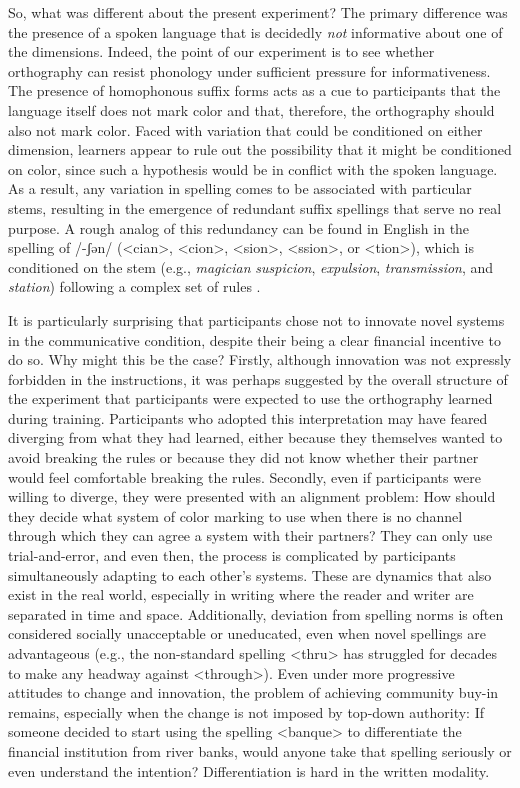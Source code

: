 \documentclass[doc,biblatex]{apa7}
\begin{document}
So, what was different about the present experiment? The primary difference was the presence of a spoken language that is decidedly \textit{not} informative about one of the dimensions. Indeed, the point of our experiment is to see whether orthography can resist phonology under sufficient pressure for informativeness. The presence of homophonous suffix forms acts as a cue to participants that the language itself does not mark color and that, therefore, the orthography should also not mark color. Faced with variation that could be conditioned on either dimension, learners appear to rule out the possibility that it might be conditioned on color, since such a hypothesis would be in conflict with the spoken language. As a result, any variation in spelling comes to be associated with particular stems, resulting in the emergence of redundant suffix spellings that serve no real purpose. A rough analog of this redundancy can be found in English in the spelling of /-ʃən/ (<cian>, <cion>, <sion>, <ssion>, or <tion>), which is conditioned on the stem (e.g., \textit{magician} \textit{suspicion}, \textit{expulsion}, \textit{transmission}, and \textit{station}) following a complex set of rules \parencite[pp.~420--421]{Carney:1994}.

It is particularly surprising that participants chose not to innovate novel systems in the communicative condition, despite their being a clear financial incentive to do so. Why might this be the case? Firstly, although innovation was not expressly forbidden in the instructions, it was perhaps suggested by the overall structure of the experiment that participants were expected to use the orthography learned during training. Participants who adopted this interpretation may have feared diverging from what they had learned, either because they themselves wanted to avoid breaking the rules or because they did not know whether their partner would feel comfortable breaking the rules. Secondly, even if participants were willing to diverge, they were presented with an alignment problem: How should they decide what system of color marking to use when there is no channel through which they can agree a system with their partners? They can only use trial-and-error, and even then, the process is complicated by participants simultaneously adapting to each other's systems. These are dynamics that also exist in the real world, especially in writing where the reader and writer are separated in time and space. Additionally, deviation from spelling norms is often considered socially unacceptable or uneducated, even when novel spellings are advantageous (e.g., the non-standard spelling <thru> has struggled for decades to make any headway against <through>). Even under more progressive attitudes to change and innovation, the problem of achieving community buy-in remains, especially when the change is not imposed by top-down authority: If someone decided to start using the spelling <banque> to differentiate the financial institution from river banks, would anyone take that spelling seriously or even understand the intention? Differentiation is hard in the written modality.
\end{document}
